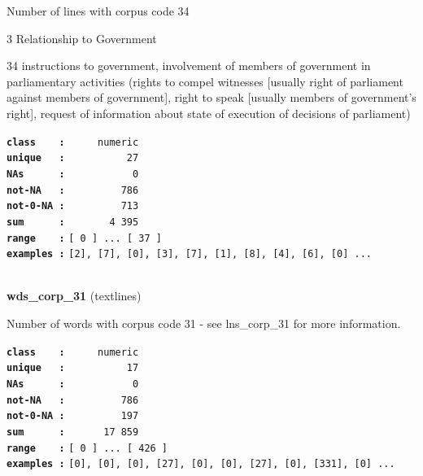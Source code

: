 \documentclass[]{article}
\begin{document}
Number of lines with corpus code 34

3 Relationship to Government

34 instructions to government, involvement of members of government in
parliamentary activities (rights to compel witnesses {[}usually right of
parliament against members of government{]}, right to speak {[}usually
members of government's right{]}, request of information about state of
execution of decisions of parliament)

\textbf{\texttt{class\ \ \ \ :}} \texttt{~~~~~numeric}\\
\textbf{\texttt{unique\ \ \ :}} \texttt{~~~~~~~~~~27}\\
\textbf{\texttt{NAs\ \ \ \ \ \ :}} \texttt{~~~~~~~~~~~0}\\
\textbf{\texttt{not-NA\ \ \ :}} \texttt{~~~~~~~~~786}\\
\textbf{\texttt{not-0-NA\ :}} \texttt{~~~~~~~~~713}\\
\textbf{\texttt{sum\ \ \ \ \ \ :}} \texttt{~~~~~~~4~395}\\
\textbf{\texttt{range\ \ \ \ :}}
\texttt{{[}\ 0\ {]}\ ...\ {[}\ 37\ {]}}\\
\textbf{\texttt{examples\ :}}
\texttt{{[}2{]},\ {[}7{]},\ {[}0{]},\ {[}3{]},\ {[}7{]},\ {[}1{]},\ {[}8{]},\ {[}4{]},\ {[}6{]},\ {[}0{]}\ ...}\\

~

\textbf{wds\_corp\_31} (textlines)

Number of words with corpus code 31 - see lns\_corp\_31 for more
information.

\textbf{\texttt{class\ \ \ \ :}} \texttt{~~~~~numeric}\\
\textbf{\texttt{unique\ \ \ :}} \texttt{~~~~~~~~~~17}\\
\textbf{\texttt{NAs\ \ \ \ \ \ :}} \texttt{~~~~~~~~~~~0}\\
\textbf{\texttt{not-NA\ \ \ :}} \texttt{~~~~~~~~~786}\\
\textbf{\texttt{not-0-NA\ :}} \texttt{~~~~~~~~~197}\\
\textbf{\texttt{sum\ \ \ \ \ \ :}} \texttt{~~~~~~17~859}\\
\textbf{\texttt{range\ \ \ \ :}}
\texttt{{[}\ 0\ {]}\ ...\ {[}\ 426\ {]}}\\
\textbf{\texttt{examples\ :}}
\texttt{{[}0{]},\ {[}0{]},\ {[}0{]},\ {[}27{]},\ {[}0{]},\ {[}0{]},\ {[}27{]},\ {[}0{]},\ {[}331{]},\ {[}0{]}\ ...}\\

~
\end{document}
